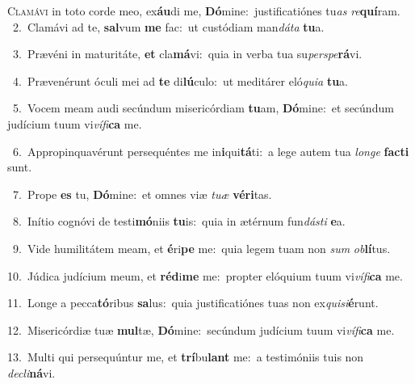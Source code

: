 \lettrine{\initial\textcolor{\initialcolor}{C}}{lamávi} in toto corde meo, ex\-\textbf{áu}\-di me, \textbf{Dó}\-mine:~\star justificatiónes tu\textit{as} \textit{re}\-\textbf{quí}ram.\\
{\numbfont\textcolor{\numbcolor}{~2.}}~Clamávi ad te, \textbf{sal}\-vum \textbf{me} fac:~\star ut custódiam man\-\textit{dá}\-\textit{ta} \textbf{tu}\-a.\par
{\numbfont\textcolor{\numbcolor}{~3.}}~Prævéni in maturitáte, \textbf{et} cla\-\textbf{má}\-vi:~\star quia in verba tua su\-\textit{per}\-\textit{spe}\textbf{rá}vi.\par
{\numbfont\textcolor{\numbcolor}{~4.}}~Prævenérunt óculi mei ad \textbf{te} di\-\textbf{lú}\-culo:~\star ut meditárer eló\-\textit{qui}\-\textit{a} \textbf{tu}\-a.\par
{\numbfont\textcolor{\numbcolor}{~5.}}~Vocem meam audi secúndum misericórdiam \textbf{tu}\-am, \textbf{Dó}\-mine:~\star et secúndum judícium tuum vi\-\textit{ví}\-\textit{fi}\textbf{ca} me.\par
{\numbfont\textcolor{\numbcolor}{~6.}}~Appropinquavérunt persequéntes me in\-\textbf{i}\-qui\-\textbf{tá}\-ti:~\star a lege autem tua \textit{lon}\-\textit{ge} \textbf{fac}\-\textbf{ti} sunt.\par
{\numbfont\textcolor{\numbcolor}{~7.}}~Prope \textbf{es} tu, \textbf{Dó}\-mine:~\star et omnes viæ \textit{tu}\-\textit{æ} \textbf{vé}\-\textbf{ri}tas.\par
{\numbfont\textcolor{\numbcolor}{~8.}}~Inítio cognóvi de testi\-\textbf{mó}\-niis \textbf{tu}\-is:~\star quia in ætérnum fun\-\textit{dás}\-\textit{ti} \textbf{e}\-a.\par
{\numbfont\textcolor{\numbcolor}{~9.}}~Vide humilitátem meam, et \textbf{é}\-ri\textbf{pe} me:~\star quia legem tuam non \textit{sum} \textit{ob}\-\textbf{lí}tus.\par
{\numbfont\textcolor{\numbcolor}{10.}}~Júdica judícium meum, et \textbf{réd}\-i\textbf{me} me:~\star propter elóquium tuum vi\-\textit{ví}\-\textit{fi}\textbf{ca} me.\par
{\numbfont\textcolor{\numbcolor}{11.}}~Longe a pecca\-\textbf{tó}\-ribus \textbf{sa}\-lus:~\star quia justificatiónes tuas non ex\-\textit{qui}\-\textit{si}\textbf{é}runt.\par
{\numbfont\textcolor{\numbcolor}{12.}}~Misericórdiæ tuæ \textbf{mul}\-tæ, \textbf{Dó}\-mine:~\star secúndum judícium tuum vi\-\textit{ví}\-\textit{fi}\textbf{ca} me.\par
{\numbfont\textcolor{\numbcolor}{13.}}~Multi qui persequúntur me, et \textbf{trí}\-bu\textbf{lant} me:~\star a testimóniis tuis non \textit{de}\-\textit{cli}\textbf{ná}vi.\par
